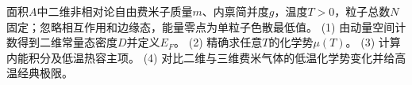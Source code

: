 面积\(A\)中二维非相对论自由费米子质量\(m\)、内禀简并度\(g\)，温度\(T>0\)，粒子总数\(N\)固定；忽略相互作用和边缘态，能量零点为单粒子色散最低值。
(1) 由动量空间计数得到二维常量态密度\(D\)并定义\(E_F\)。
(2) 精确求任意\(T\)的化学势\(\mu(T)\)。
(3) 计算内能积分及低温热容主项。
(4) 对比二维与三维费米气体的低温化学势变化并给高温经典极限。
